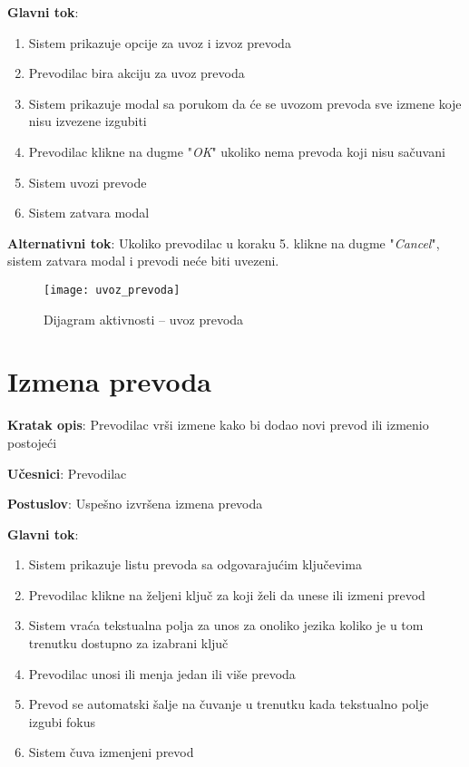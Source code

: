 \textbf{Glavni tok}:
\begin{enumerate}
    \item Sistem prikazuje opcije za uvoz i izvoz prevoda
    \item Prevodilac bira akciju za uvoz prevoda
    \item Sistem prikazuje modal sa porukom da će se uvozom prevoda sve 
    izmene koje nisu izvezene izgubiti
    \item Prevodilac klikne na dugme "\textit{OK}" ukoliko nema prevoda koji nisu sačuvani
    \item Sistem uvozi prevode
    \item Sistem zatvara modal
\end{enumerate}

\textbf{Alternativni tok}: Ukoliko prevodilac u koraku 5. klikne na dugme "\textit{Cancel}", 
sistem zatvara modal i prevodi neće biti uvezeni.

\begin{figure}[H]
    \centering
    \texttt{[image: uvoz\_prevoda]}
    \caption{Dijagram aktivnosti -- uvoz prevoda}
\end{figure}


\section{Izmena prevoda}

\textbf{Kratak opis}: Prevodilac vrši izmene kako bi dodao novi prevod ili izmenio postojeći

\textbf{Učesnici}: Prevodilac

\textbf{Postuslov}: Uspešno izvršena izmena prevoda

\textbf{Glavni tok}:
\begin{enumerate}
    \item Sistem prikazuje listu prevoda sa odgovarajućim ključevima
    \item Prevodilac klikne na željeni ključ za koji želi da unese ili izmeni prevod
    \item Sistem vraća tekstualna polja za unos za onoliko jezika koliko je u tom 
    trenutku dostupno za izabrani ključ
    \item Prevodilac unosi ili menja jedan ili više prevoda
    \item Prevod se automatski šalje na čuvanje u trenutku kada tekstualno polje izgubi fokus
    \item Sistem čuva izmenjeni prevod
\end{enumerate}

